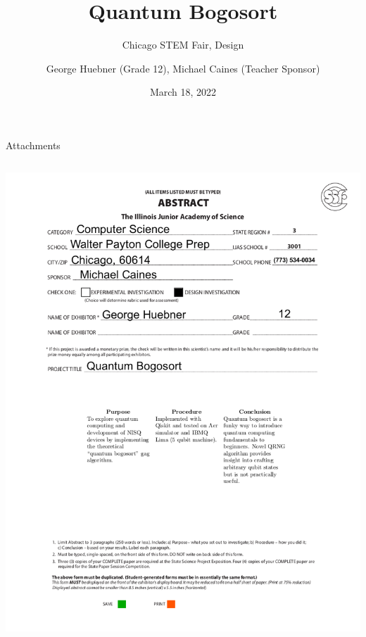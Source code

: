 \documentclass{beamer}
\title{Quantum Bogosort}
\subtitle{Chicago STEM Fair, Design}
\date{March 18, 2022}
\author{George Huebner (Grade 12), Michael Caines (Teacher Sponsor)}
\institute{Walter Payton College Prep}
\begin{document}
  \maketitle
  
  \begin{frame}{Attachments}
    \begin{columns}
            \includegraphics[width=\linewidth]{images/abstract.png}

\end{columns}
\end{frame}
\end{document}
